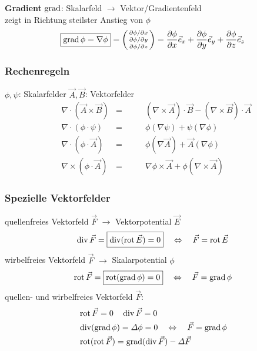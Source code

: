 \textbf{Gradient} $\operatorname{grad}$: Skalarfeld $\rightarrow$ Vektor/Gradientenfeld\\
\small{zeigt in Richtung steilster Anstieg von $\phi$}
\begin{align*}
	\boxed{\operatorname{grad} \phi = \nabla \phi }=
	\begin{psmallmatrix}
		\partial \phi / \partial x \\
		\partial \phi / \partial y \\
		\partial \phi / \partial z
	\end{psmallmatrix}
	= \dfrac{\partial \phi}{\partial x} \vec{e}_x + \dfrac{\partial \phi}{\partial y} \vec{e}_y +
	\dfrac{\partial \phi}{\partial z} \vec{e}_z
\end{align*}

\subsubsection{Rechenregeln}
$\phi, \psi$: Skalarfelder \qquad $\vec{A}, \vec{B}$: Vektorfelder
\begin{align*}
	 & \nabla \cdot (\vec{A} \times \vec{B}) & = & \qquad (\nabla \times \vec{A})\cdot\vec{B} - (\nabla\times\vec{B})\cdot\vec{A} \\
	 & \nabla \cdot (\phi \cdot \psi)        & = & \qquad \phi (\nabla \psi) + \psi( \nabla \phi)                                 \\
	 & \nabla \cdot (\phi \cdot \vec{A})     & = & \qquad \phi (\nabla \vec{A}) + \vec{A}(\nabla \phi)                            \\
	 & \nabla \times (\phi \cdot \vec{A})    & = & \qquad \nabla \phi \times \vec{A} + \phi (\nabla \times \vec{A})
\end{align*}

\subsubsection{Spezielle Vektorfelder}
quellenfreies Vektorfeld $\vec{F}$ $\rightarrow$ Vektorpotential $\vec{E}$
\begin{align*}
	\operatorname{div} \vec{F} = \boxed{\operatorname{div} (\operatorname{rot} \vec{E}) = 0} \quad \Leftrightarrow \quad  \vec{F} = \operatorname{rot} \vec{E}
\end{align*}
wirbelfreies Vektorfeld $\vec{F}$ $\rightarrow$ Skalarpotential $\phi$
\begin{align*}
	\operatorname{rot} \vec{F} = \boxed{\operatorname{rot} (\operatorname{grad} \phi) = 0} \quad \Leftrightarrow \quad  \vec{F} = \operatorname{grad} \phi
\end{align*}
quellen- und wirbelfreies Vektorfeld $\vec{F}$:
\begin{align*}
	 & \operatorname{rot} \vec{F}  = 0 \quad \operatorname{div} \vec{F} = 0                                                   \\
	 & \operatorname{div} (\operatorname{grad} \phi) = \varDelta \phi = 0 \quad \Leftrightarrow \quad  \vec{F} = \operatorname{grad} \phi \\
	 & \operatorname{rot} (\operatorname{rot} \vec{F})  = \operatorname{grad} (\operatorname{div} \vec{F}) - \varDelta \vec{F}
\end{align*}

